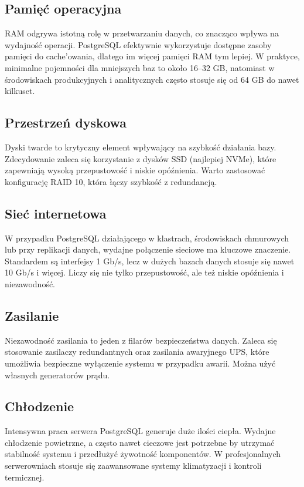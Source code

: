 \documentclass[a4paper,11pt,polish]{sphinxmanual}
\begin{document}
\subsection{Pamięć operacyjna}
\label{\detokenize{Sprzet-dla-bazy-danych/source/SprzetDlaBazyDanych:pamiec-operacyjna}}
\sphinxAtStartPar
RAM odgrywa istotną rolę w przetwarzaniu danych, co znacząco wpływa na wydajność operacji. PostgreSQL efektywnie wykorzystuje dostępne zasoby pamięci do cache’owania, dlatego im więcej pamięci RAM tym lepiej. W praktyce, minimalne pojemności dla mniejszych baz to około 16–32 GB, natomiast w środowiskach produkcyjnych i analitycznych często stosuje się od 64 GB do nawet kilkuset.


\subsection{Przestrzeń dyskowa}
\label{\detokenize{Sprzet-dla-bazy-danych/source/SprzetDlaBazyDanych:przestrzen-dyskowa}}
\sphinxAtStartPar
Dyski twarde to krytyczny element wpływający na szybkość działania bazy. Zdecydowanie zaleca się korzystanie z dysków SSD (najlepiej NVMe), które zapewniają wysoką przepustowość i niskie opóźnienia. Warto zastosować konfigurację RAID 10, która łączy szybkość z redundancją.


\subsection{Sieć internetowa}
\label{\detokenize{Sprzet-dla-bazy-danych/source/SprzetDlaBazyDanych:siec-internetowa}}
\sphinxAtStartPar
W przypadku PostgreSQL działającego w klastrach, środowiskach chmurowych lub przy replikacji danych, wydajne połączenie sieciowe ma kluczowe znaczenie. Standardem są interfejsy 1 Gb/s, lecz w dużych bazach danych stosuje się nawet 10 Gb/s i więcej. Liczy się nie tylko przepustowość, ale też niskie opóźnienia i niezawodność.


\subsection{Zasilanie}
\label{\detokenize{Sprzet-dla-bazy-danych/source/SprzetDlaBazyDanych:zasilanie}}
\sphinxAtStartPar
Niezawodność zasilania to jeden z filarów bezpieczeństwa danych. Zaleca się stosowanie zasilaczy redundantnych oraz zasilania awaryjnego UPS, które umożliwia bezpieczne wyłączenie systemu w przypadku awarii. Można użyć własnych generatorów prądu.


\subsection{Chłodzenie}
\label{\detokenize{Sprzet-dla-bazy-danych/source/SprzetDlaBazyDanych:chlodzenie}}
\sphinxAtStartPar
Intensywna praca serwera PostgreSQL generuje duże ilości ciepła. Wydajne chłodzenie powietrzne, a często nawet cieczowe jest potrzebne by utrzymać stabilność systemu i przedłużyć żywotność komponentów. W profesjonalnych serwerowniach stosuje się zaawansowane systemy klimatyzacji i kontroli termicznej.
\end{document}

